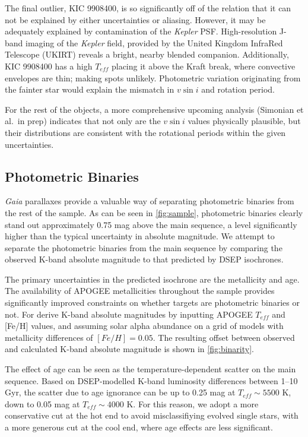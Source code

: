 \documentclass[manuscript]{aastex6}
\newcommand{\vsini}{\ensuremath{v \sin i}}
\newcommand{\Kepler}{\mbox{\textit{Kepler}}}
\newcommand{\Gaia}{\mbox{\textit{Gaia}}}
\newcommand{\Teff}{\ensuremath{T_{eff}}}
\begin{document}
The final outlier, KIC 9908400, is so significantly off of the relation
that it can not be explained by either uncertainties or aliasing. However,
it may be adequately explained by contamination of the \Kepler{} PSF\@. 
High-resolution J-band imaging of the \Kepler{} field, provided by the United
Kingdom InfraRed Telescope (UKIRT) reveals a bright, nearby blended companion.
Additionally, KIC 9908400 has a high \Teff{} placing it above the Kraft
break, where convective envelopes are thin;
making spots unlikely. Photometric variation originating from the fainter 
star would explain the mismatch in \vsini{} and rotation period.

For the rest of the objects, a more comprehensive upcoming analysis 
(Simonian et al.\ in prep) indicates that not only are the \vsini{} values 
physically plausible, but their distributions are consistent with the
rotational periods within the given uncertainties.

\subsection{Photometric Binaries}

\Gaia{} parallaxes provide a valuable way of separating photometric binaries
from the rest of the sample. As can be seen in \cref{fig:sample}, photometric
binaries clearly stand out approximately 0.75 mag above the main sequence, a
level significantly higher than the typical uncertainty in absolute magnitude. 
We attempt to separate the photometric binaries from the main sequence by
comparing the observed K-band absolute magnitude to that predicted by DSEP
isochrones.

The primary uncertainties in the predicted isochrone are the metallicity and
age. The availability of APOGEE metallicities throughout the sample provides
significantly improved constraints on whether targets are photometric binaries
or not. For derive K-band absolute magnitudes by inputting APOGEE
\Teff{} and [Fe/H] values, and assuming solar alpha abundance on a grid of
models with metallicity differences of \([Fe/H] = 0.05\). The resulting offset
between observed and calculated K-band absolute magnitude is shown in 
\cref{fig:binarity}. 

The effect of age can be seen as the temperature-dependent scatter on the main
sequence. Based on DSEP-modelled K-band luminosity differences between 1--10
Gyr, the scatter due to age ignorance can be up to 0.25 mag at \(\Teff \sim
5500\) K, down to 0.05 mag at \(\Teff \sim 4000 \) K. For this reason, we adopt
a more conservative cut at the hot end to avoid misclassifiying evolved single
stars, with a more generous cut at the cool end, where age effects are less
significant.
\end{document}

